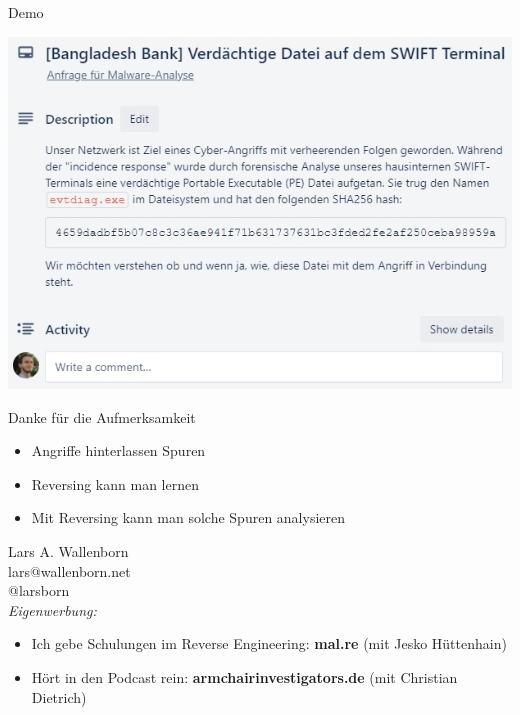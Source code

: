 \documentclass[aspectratio=169,handout]{beamer}
\begin{document}
\begin{frame}{Demo}
  \begin{center}
    \includegraphics[width=0.6\paperwidth]{images/ticket.jpg}
  \end{center}
\end{frame}

\begin{frame}{Danke für die Aufmerksamkeit}
  \begin{itemize}
    \item Angriffe hinterlassen Spuren
    \item Reversing kann man lernen
    \item Mit Reversing kann man solche Spuren analysieren
  \end{itemize}
  Lars A. Wallenborn\\
  lars@wallenborn.net\\
  @larsborn\\
  \vspace{1cm}
  \emph{Eigenwerbung:}\\
  \begin{itemize}
  \item Ich gebe Schulungen im Reverse Engineering: \textbf{mal.re} (mit Jesko Hüttenhain)
    \item Hört in den Podcast rein: \textbf{armchairinvestigators.de} (mit Christian Dietrich)
  \end{itemize}
\end{frame}
\end{document}
